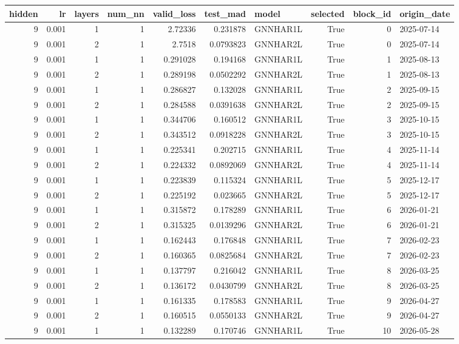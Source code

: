 \begin{tabular}{rrrrrrlrrl}
\toprule
hidden & lr & layers & num_nn & valid_loss & test_mad & model & selected & block_id & origin_date \\
\midrule
9 & 0.001 & 1 & 1 & 2.72336 & 0.231878 & GNNHAR1L & True & 0 & 2025-07-14 \\
9 & 0.001 & 2 & 1 & 2.7518 & 0.0793823 & GNNHAR2L & True & 0 & 2025-07-14 \\
9 & 0.001 & 1 & 1 & 0.291028 & 0.194168 & GNNHAR1L & True & 1 & 2025-08-13 \\
9 & 0.001 & 2 & 1 & 0.289198 & 0.0502292 & GNNHAR2L & True & 1 & 2025-08-13 \\
9 & 0.001 & 1 & 1 & 0.286827 & 0.132028 & GNNHAR1L & True & 2 & 2025-09-15 \\
9 & 0.001 & 2 & 1 & 0.284588 & 0.0391638 & GNNHAR2L & True & 2 & 2025-09-15 \\
9 & 0.001 & 1 & 1 & 0.344706 & 0.160512 & GNNHAR1L & True & 3 & 2025-10-15 \\
9 & 0.001 & 2 & 1 & 0.343512 & 0.0918228 & GNNHAR2L & True & 3 & 2025-10-15 \\
9 & 0.001 & 1 & 1 & 0.225341 & 0.202715 & GNNHAR1L & True & 4 & 2025-11-14 \\
9 & 0.001 & 2 & 1 & 0.224332 & 0.0892069 & GNNHAR2L & True & 4 & 2025-11-14 \\
9 & 0.001 & 1 & 1 & 0.223839 & 0.115324 & GNNHAR1L & True & 5 & 2025-12-17 \\
9 & 0.001 & 2 & 1 & 0.225192 & 0.023665 & GNNHAR2L & True & 5 & 2025-12-17 \\
9 & 0.001 & 1 & 1 & 0.315872 & 0.178289 & GNNHAR1L & True & 6 & 2026-01-21 \\
9 & 0.001 & 2 & 1 & 0.315325 & 0.0139296 & GNNHAR2L & True & 6 & 2026-01-21 \\
9 & 0.001 & 1 & 1 & 0.162443 & 0.176848 & GNNHAR1L & True & 7 & 2026-02-23 \\
9 & 0.001 & 2 & 1 & 0.160365 & 0.0825684 & GNNHAR2L & True & 7 & 2026-02-23 \\
9 & 0.001 & 1 & 1 & 0.137797 & 0.216042 & GNNHAR1L & True & 8 & 2026-03-25 \\
9 & 0.001 & 2 & 1 & 0.136172 & 0.0430799 & GNNHAR2L & True & 8 & 2026-03-25 \\
9 & 0.001 & 1 & 1 & 0.161335 & 0.178583 & GNNHAR1L & True & 9 & 2026-04-27 \\
9 & 0.001 & 2 & 1 & 0.160515 & 0.0550133 & GNNHAR2L & True & 9 & 2026-04-27 \\
9 & 0.001 & 1 & 1 & 0.132289 & 0.170746 & GNNHAR1L & True & 10 & 2026-05-28 \\

\end{tabular}
